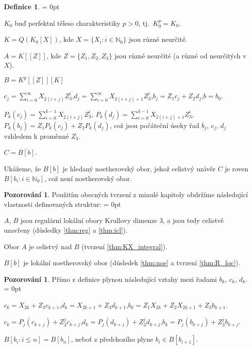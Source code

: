 \documentclass[11pt,a4paper]{article}
\newcommand\m[1]{\mathbb { #1 }} %
\newcommand\N{\m N}
\let \icl \overline %
\newenvironment{items}{%
	\itemize
	\itemsep = 0pt%
}{%
	\enditemize
}
\newcounter{numb}
\theoremstyle{definition}
\newtheorem*{definice}{Definice}
\newtheorem{pozorovani}[numb]{Pozorování}
\theoremstyle{plain}
\begin{document}
\begin{definice} \hfill
	\newcommand*{\I}{_{i = 0}^\infty}
	\newcommand*{\PI}{_{i = 0}^{k - 1}}

	\begin{items}
		\item $K_0$ buď perfektní těleso charakteristiky $p > 0$, tj.\ $K_0^p = K_0$.
		\item $K = Q(K_0[X])$, kde $X = \{X_i: i \in \N_0\}$ jsou různé neurčité.
		\item $A = K[[Z]]$, kde $Z = \{Z_1, Z_2, Z_3\}$ jsou různé neurčité (a různé od neurčitých v $X$).
		\item $B = K^p[[Z]][K]$
		\item $c_j = \sum\I X_{2(i + j)} Z_3^i$,\quad $d_j = \sum\I X_{2(i + j) + 1} Z_3^i$,\quad $b_j = Z_1 c_j + Z_2 d_j$,\quad $b = b_0$.
		\item $P_k(c_j) = \sum\PI X_{2(i + j)} Z_3^i$, $P_k(d_j) = \sum\PI X_{2(i + j) + 1} Z_3^i$, $P_k(b_j) = Z_1 P_k(c_j) + Z_2 P_k(d_j)$, což jsou počáteční úseky řad $b_j$, $c_j$, $d_j$ vzhledem k proměnné $Z_3$.
		\item $C = \icl{B[b]}$.
	\end{items}
\end{definice}

\newcommand*{\Ball}{B[b_i: i \in \N_0]} %
\newcommand*{\Bcdall}{B[c_i, d_i: i \in \N_0]}

Ukážeme, že $B[b]$ je hledaný noetherovský obor, jehož celistvý uzávěr $C$ je roven $B[b_i: i \in \N_0]$, což není noetherovský obor.

\begin{pozorovani}
	Použitím obecných tvrzení z minulé kapitoly obdržíme následující vlastnosti definovaných struktur:
	\begin{items}
		\item $A$, $B$ jsou regulární lokální obory Krullovy dimenze $3$, a jsou tedy celistvě uzavřeny (důsledky \ref{thm:reg} a \ref{thm:icl}).
		\item Obor $A$ je celistvý nad $B$ (tvrzení \ref{thm:KX_integral}).
		\item $B[b]$ je lokální noetherovský obor (důsledek \ref{thm:noe} a tvrzení \ref{thm:R_loc}).
	\end{items}
\end{pozorovani}

\begin{pozorovani} \label{thm:bcd_vztahy} Přímo z definice plynou následující vztahy mezi řadami $b_k$, $c_k$, $d_k$.
	\begin{items}
		\item $c_k = X_{2k} + Z_3 c_{k + 1}$,\quad $d_k = X_{2k + 1} + Z_3 d_{k + 1}$,\quad $b_k = Z_1 X_{2k} + Z_2 X_{2k + 1} + Z_3 b_{k + 1}$.
		\item $c_k = P_j(c_{k + j}) + Z_3^j c_{k + j}$,\quad $d_k = P_j(d_{k + j}) + Z_3^j d_{k + j}$,\quad $b_k = P_j(b_{k + j}) + Z_3^j b_{k +j}$.
		\item $B[b_i: i \leq n] = B[b_n]$, neboť z předchozího plyne $b_i \in B[b_{i + 1}]$.
	\end{items}
\end{pozorovani}
\end{document}
